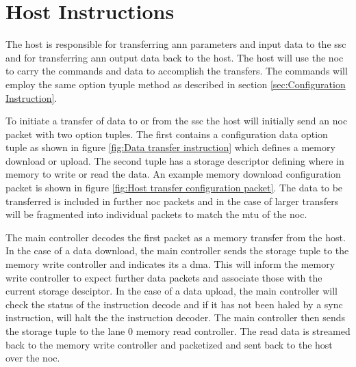 \section{Host Instructions}
\label{sec:Host Instructions}

The host is responsible for transferring \ac{ann} parameters and input data to the \ac{ssc} and for transferring \ac{ann} output data back to the host.
The host will use the \ac{noc} to carry the commands and data to accomplish the transfers.
The commands will employ the same option tyuple method as described in section \ref{sec:Configuration Instruction}.

To initiate a transfer of data to or from the \ac{ssc} the host will initially send an \ac{noc} packet with two option tuples.
The first contains a configuration data option tuple as shown in figure \ref{fig:Data transfer instruction} which defines a memory download or upload.
The second tuple has a storage descriptor defining where in memory to write or read the data.
An example memory download configuration packet is shown in figure \ref{fig:Host transfer configuration packet}.
The data to be transferred is included in further \ac{noc} packets and in the case of larger transfers will be fragmented into individual packets to match the \ac{mtu} of the \ac{noc}.

The main controller decodes the first packet as a memory transfer from the host. 
In the case of a data download, the main controller sends the storage tuple to the memory write controller and indicates its a \ac{dma}.
This will inform the memory write controller to expect further data packets and associate those with the current storage desciptor.
In the case of a data upload, the main controller will check the status of the instruction decode and if it has not been haled by a sync instruction, will halt the the instruction decoder.
The main controller then sends the storage tuple to the lane 0 memory read controller.
The read data is streamed back to the memory write controller and packetized and sent back to the host over the \ac{noc}.


